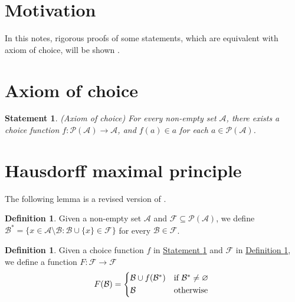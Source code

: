 \documentclass[12pt]{article}
\numberwithin{equation}{section}
\theoremstyle{plain} %
\newtheorem{statement}[equation]{Statement}
\theoremstyle{definition}
\newtheorem{definition}[equation]{Definition}
\theoremstyle{remark}
\begin{document}

\section{Motivation}
In this notes, rigorous proofs of some statements, which are equivalent with axiom of choice, will be shown .  

\section{Axiom of choice}

\begin{statement}
\textup{(Axiom of choice)} \textit{For every non-empty set $\mathcal{A}$, there exists a choice function $f: \mathcal{P} (\mathcal{A}) \to \mathcal{A}$, and $f(a) \in a$ for each $a \in \mathcal{P} (\mathcal{A})$. } \label{statement:Axiom of choice}
\end{statement}

\section{Hausdorff maximal principle}
The following lemma is a revised version of \citep{Spronk.2019}.
\begin{definition}
Given a  non-empty set $\mathcal{A}$ and $\mathcal{F} \subseteq \mathcal{P}(\mathcal{A})$, we define $\mathcal{B}^*=\{x \in \mathcal{A} \setminus \mathcal{B}: \mathcal{B} \cup \{x\} \in  \mathcal{F} \}$ for every $\mathcal{B} \in \mathcal{F}$. \label{definition:F}
\end{definition}

\begin{definition}
Given a choice function $f$ in \hyperref[statement:Axiom of choice]{Statement \ref*{statement:Axiom of choice}} and $\mathcal{F}$ in \hyperref[definition:F]{Definition \ref*{definition:F}}, we define a function $F: \mathcal{F} \to \mathcal{F}$ \label{definition:B_star}
	\begin{equation*}
	    F(\mathcal{B}) =
	    \begin{cases*}
		      \mathcal{B} \cup {f(\mathcal{B}^*)} & if $\mathcal{B}^* \neq  \varnothing$ \\
		     \mathcal{B}       & otherwise
	    \end{cases*}
	 \end{equation*}
\end{definition}
\end{document}

